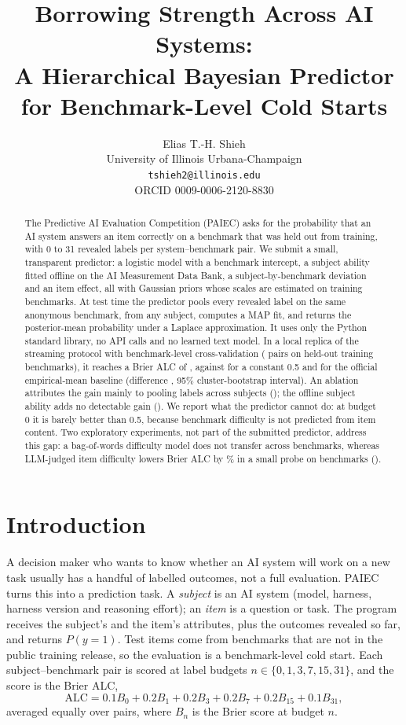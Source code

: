 \documentclass{article}
\title{Borrowing Strength Across AI Systems:\\ A Hierarchical Bayesian Predictor for Benchmark-Level Cold Starts}
\author{%
  Elias T.-H. Shieh\\
  University of Illinois Urbana-Champaign\\
  \texttt{tshieh2@illinois.edu}\\
  ORCID 0009-0006-2120-8830
}
\begin{document}
\maketitle

\begin{abstract}
The Predictive AI Evaluation Competition (PAIEC) asks for the probability that an AI system answers an item correctly on a benchmark that was held out from training, with 0 to 31 revealed labels per system--benchmark pair. We submit a small, transparent predictor: a logistic model with a benchmark intercept, a subject ability fitted offline on the AI Measurement Data Bank, a subject-by-benchmark deviation and an item effect, all with Gaussian priors whose scales are estimated on training benchmarks. At test time the predictor pools every revealed label on the same anonymous benchmark, from any subject, computes a MAP fit, and returns the posterior-mean probability under a Laplace approximation. It uses only the Python standard library, no API calls and no learned text model. In a local replica of the streaming protocol with benchmark-level cross-validation (\NPairs{} pairs on \NBench{} held-out training benchmarks), it reaches a Brier ALC of \AlcOurs{}, against \AlcConst{} for a constant 0.5 and \AlcMean{} for the official empirical-mean baseline (difference \DiffMean{}, 95\% cluster-bootstrap interval). An ablation attributes the gain mainly to pooling labels across subjects (\DiffPool{}); the offline subject ability adds no detectable gain (\DiffSubj{}). We report what the predictor cannot do: at budget 0 it is barely better than 0.5, because benchmark difficulty is not predicted from item content. Two exploratory experiments, not part of the submitted predictor, address this gap: a bag-of-words difficulty model does not transfer across benchmarks, whereas LLM-judged item difficulty lowers Brier ALC by \LlmRelFour\% in a small probe on \LlmBench{} benchmarks (\LlmDiffFour{}).
\end{abstract}

\section{Introduction}

A decision maker who wants to know whether an AI system will work on a new task usually has a handful of labelled outcomes, not a full evaluation. PAIEC \citep{paiec2026} turns this into a prediction task. A \emph{subject} is an AI system (model, harness, harness version and reasoning effort); an \emph{item} is a question or task. The program receives the subject's and the item's attributes, plus the outcomes revealed so far, and returns $P(y=1)$. Test items come from benchmarks that are not in the public training release, so the evaluation is a benchmark-level cold start. Each subject--benchmark pair is scored at label budgets $n \in \{0,1,3,7,15,31\}$, and the score is the Brier ALC,
\begin{equation}
  \text{ALC} = 0.1B_0 + 0.2B_1 + 0.2B_3 + 0.2B_7 + 0.2B_{15} + 0.1B_{31},
\end{equation}
averaged equally over pairs, where $B_n$ is the Brier score at budget $n$.
\end{document}
